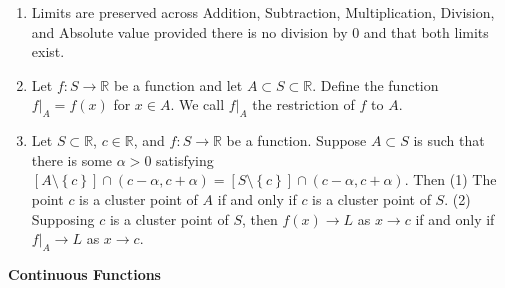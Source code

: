 \documentclass[12pt]{article}
\newcommand{\set}[1]{\left\{ {#1} \right\}}
\newcommand{\paren}[1]{\left( {#1} \right)}
\newcommand{\bR}{\mathbb{R}}
\begin{document}
\begin{enumerate}
	\item Limits are preserved across Addition, Subtraction, Multiplication, Division, and Absolute value provided there is no division by 0 and that both limits exist.
	\item Let $f:S\to\bR$ be a function and let $A\subset S\subset\bR$. Define the function $f|_A=f(x)$ for $x\in A$. We call $f|_A$ the restriction of $f$ to $A$.
	\item Let $S\subset\bR$, $c\in\bR$, and $f:S\to\bR$ be a function. Suppose $A\subset S$ is such that there is some $\alpha>0$ satisfying $[A\setminus\set{c}]\cap\paren{c-\alpha, c+\alpha}=[S\setminus\set{c}]\cap\paren{c-\alpha, c+\alpha}$. Then (1) The point $c$ is a cluster point of $A$ if and only if $c$ is a cluster point of $S$. (2) Supposing $c$ is a cluster point of $S$, then $f(x)\to L$ as $x\to c$ if and only if $f|_A\to L$ as $x\to c$.
\end{enumerate}

\noindent \textbf{Continuous Functions}
\end{document}
